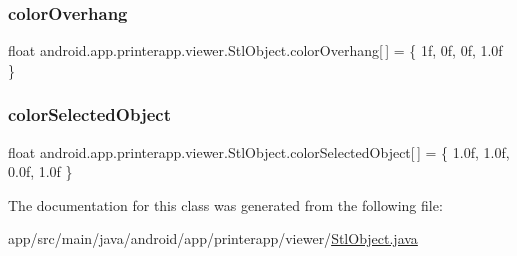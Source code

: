 \subsubsection{\texorpdfstring{color\+Overhang}{colorOverhang}}
{\footnotesize\ttfamily float android.\+app.\+printerapp.\+viewer.\+Stl\+Object.\+color\+Overhang\mbox{[}$\,$\mbox{]} = \{ 1f, 0f, 0f, 1.\+0f \}\hspace{0.3cm}{\ttfamily [static]}}

\mbox{\label{classandroid_1_1app_1_1printerapp_1_1viewer_1_1_stl_object_a1f9eee41dd48a5bb73fd0289ab1a6b2c}} 
\subsubsection{\texorpdfstring{color\+Selected\+Object}{colorSelectedObject}}
{\footnotesize\ttfamily float android.\+app.\+printerapp.\+viewer.\+Stl\+Object.\+color\+Selected\+Object\mbox{[}$\,$\mbox{]} = \{ 1.\+0f, 1.\+0f, 0.\+0f, 1.\+0f \}\hspace{0.3cm}{\ttfamily [static]}}



The documentation for this class was generated from the following file\+:\begin{DoxyCompactItemize}
\item 
app/src/main/java/android/app/printerapp/viewer/\hyperlink{_stl_object_8java}{Stl\+Object.\+java}\end{DoxyCompactItemize}
